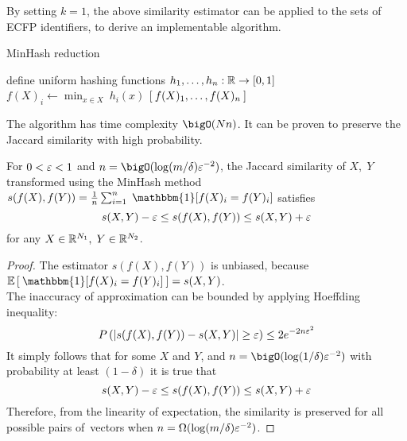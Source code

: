 \noindent
By setting \( k = 1 \), the above similarity estimator can be applied to the sets of ECFP identifiers, to derive an implementable algorithm.
\begin{algorithm}[H]
    \caption{MinHash reduction}
    \label{alg:mh}
    \begin{algorithmic}[1]
        \State define uniform hashing functions \( h_1, \dots, h_n: \mathbb{R} \rightarrow [0,1] \)
        \State \( f(X)_i \gets \min_{x \in X}\: h_i(x) \)
        \State \Return \( \left[ \:f(X)_1, \dots, f(X)_n\: \right] \)
    \end{algorithmic}
\end{algorithm}
\noindent
The algorithm has time complexity \( \bigO(Nn) \). It can be proven to preserve the Jaccard similarity with high probability.
\begin{propos}
\label{propos:MH}
For \( 0 < \varepsilon < 1 \) and \( n = \bigO(\log(m/\delta)\eps^{-2}) \), the Jaccard similarity of \( X,\;Y \) transformed using the MinHash method 
\(
    s(f(X),f(Y)) = \frac{1}{n} \sum_{i=1}^{n}\; \mathbbm{1}\!\brackets{f(X)_i = f(Y)_i}
\)
satisfies
\[
    s(X,Y) - \varepsilon \leq s(f(X),f(Y)) \leq s(X,Y) + \varepsilon
\]
for any \( X \in \mathbb{R}^{N_1},\; Y \in \mathbb{R}^{N_2} \).
\end{propos}
\begin{proof}
The estimator \( s(f(X),f(Y)) \) is unbiased, because \( \mathbb{E}\brackets{\: \mathbbm{1}\!\brackets{f(X)_i = f(Y)_i} \:} = s(X,Y) \). \\
The inaccuracy of approximation can be bounded by applying Hoeffding inequality:
\[
    P\left( \left| s(f(X),f(Y)) - s(X,Y) \right| \geq \varepsilon \right) \leq 2e^{-2n\varepsilon^2}
\]
It simply follows that for some \( X \) and  \( Y \), and \( n = \bigO(\log(1/\delta)\eps^{-2}) \) with probability at least \( (1-\delta) \) it is true that
\[
    s(X,Y) - \varepsilon \leq s(f(X), f(Y)) \leq s(X,Y) + \varepsilon
\]
Therefore, from the linearity of expectation, the similarity is preserved for all possible pairs of~vectors when \( n = \Omega(\log(m/\delta)\varepsilon^{-2}) \).
\end{proof}